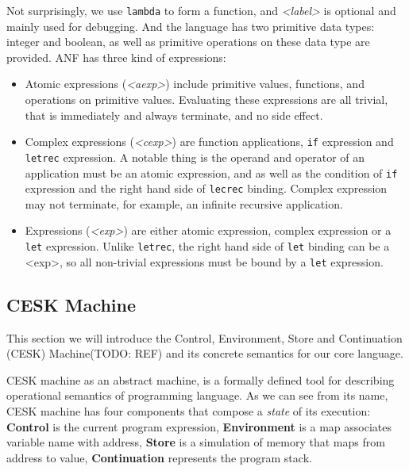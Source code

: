 \documentclass[paper=a4, fontsize=11pt]{scrartcl} %
\numberwithin{equation}{section} %
\numberwithin{figure}{section} %
\numberwithin{table}{section} %
\begin{document}
Not surprisingly, we use \texttt{lambda} to form a function, and \textit{<label>} is optional and mainly used for debugging. And the language has two primitive data types: integer and boolean, as well as primitive operations on these data type are provided. ANF has three kind of expressions:

\begin{itemize}
\item Atomic expressions (\textit{<aexp>}) include primitive values, functions, and operations on primitive values. Evaluating these expressions are all trivial, that is immediately and always terminate, and no side effect.

\item Complex expressions (\textit{<cexp>}) are function applications, \texttt{if} expression and \texttt{letrec} expression. A notable thing is the operand and operator of an application must be an atomic expression, and as well as the condition of \texttt{if} expression and the right hand side of \texttt{lecrec} binding. Complex expression may not terminate, for example, an infinite recursive application.

\item Expressions (\textit{<exp>}) are either atomic expression, complex expression or a \texttt{let} expression. Unlike \texttt{letrec}, the right hand side of \texttt{let} binding can be a <exp>, so all non-trivial expressions must be bound by a \texttt{let} expression.
\end{itemize}


\subsection{CESK Machine}

This section we will introduce the Control, Environment, Store and Continuation (CESK) Machine(TODO: REF) and its concrete semantics for our core language.

CESK machine as an abstract machine, is a formally defined tool for describing operational semantics of programming language. As we can see from its name, CESK machine has four components that compose a \textit{state} of its execution: \textbf{Control} is the current program expression, \textbf{Environment} is a map associates variable name with address, \textbf{Store} is a simulation of memory that maps from address to value, \textbf{Continuation} represents the program stack. 
\end{document}
